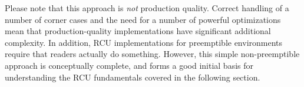 Please note that this approach is \emph{not} production quality.
Correct handling of a number of corner cases and the need for a number
of powerful optimizations mean that production-quality implementations
have significant additional complexity.
In addition, RCU implementations for preemptible environments
require that readers actually do something.
However, this simple non-preemptible approach is conceptually complete,
and forms a good initial basis for understanding the RCU fundamentals
covered in the following section.
